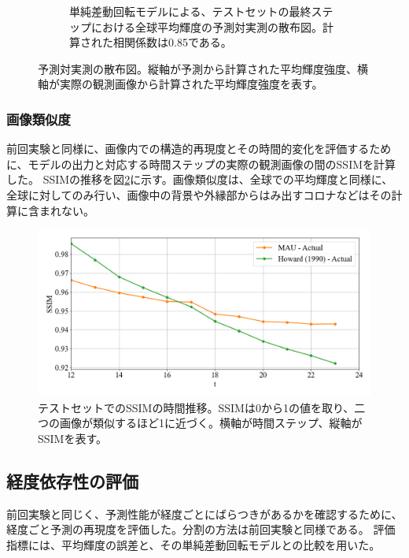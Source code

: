 \begin{figure}[htbp]
\begin{subfigure}[b]{0.55\textwidth}
            \caption{単純差動回転モデルによる、テストセットの最終ステップにおける全球平均輝度の予測対実測の散布図。計算された相関係数は0.85である。}
          \end{subfigure}
          \caption{予測対実測の散布図。縦軸が予測から計算された平均輝度強度、横軸が実際の観測画像から計算された平均輝度強度を表す。}
          \label{fig:exp2_dr_scatter}
        \end{figure}

      \subsubsection{画像類似度}
        前回実験と同様に、画像内での構造的再現度とその時間的変化を評価するために、モデルの出力と対応する時間ステップの実際の観測画像の間のSSIMを計算した。
        SSIMの推移を図\ref{fig:exp2_ssim}に示す。画像類似度は、全球での平均輝度と同様に、全球に対してのみ行い、画像中の背景や外縁部からはみ出すコロナなどはその計算に含まれない。
        \begin{figure}[htbp]
          \centering
          \includegraphics[width=\textwidth]{figures/exp2/average_ssim.png}
          \caption{テストセットでのSSIMの時間推移。SSIMは0から1の値を取り、二つの画像が類似するほど1に近づく。横軸が時間ステップ、縦軸がSSIMを表す。}
          \label{fig:exp2_ssim}
        \end{figure}

        
      \subsection{経度依存性の評価}
        前回実験と同じく、予測性能が経度ごとにばらつきがあるかを確認するために、経度ごと予測の再現度を評価した。分割の方法は前回実験と同様である。
        評価指標には、平均輝度の誤差と、その単純差動回転モデルとの比較を用いた。


